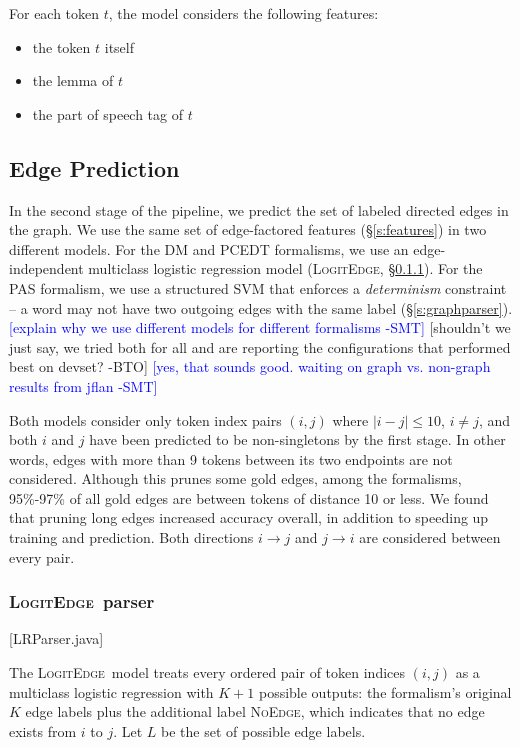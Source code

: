 \documentclass[11pt]{article}
\newcommand{\bocomment}[1]{\textcolor{Bittersweet}{[#1 -BTO]}}
\newcommand{\sam}[1]{\textcolor{blue}{[#1 -SMT]}}
\newcommand{\codenote}[1]{\textcolor{PineGreen}{[#1]}}
\newcommand{\logitedge}{\textsc{LogitEdge}}
\newcommand{\noedge}{\textsc{NoEdge}}
\begin{document}
For each token $t$, the model considers the following features:
\begin{itemize}
\item the token $t$ itself
\item the lemma of $t$
\item the part of speech tag of $t$
\end{itemize}



\subsection{Edge Prediction} \label{s:edge_model}

In the second stage of the pipeline, we predict the set of labeled directed
edges in the graph.
We use the same set of edge-factored features (\S\ref{s:features}) in two
different models.
For the DM and PCEDT formalisms, we use an edge-independent multiclass logistic
regression model (\logitedge, \S\ref{s:logitedge}).
For the PAS formalism, we use a structured SVM 
\cite{taskar_max_2003,tsochantaridis_support_2004} that enforces a
\emph{determinism} constraint -- a word may not have two outgoing edges with the
same label (\S\ref{s:graphparser}).
\sam{explain why we use different models for different formalisms}
\bocomment{shouldn't we just say, we tried both for all and are reporting the configurations that performed best on devset?}
\sam{yes, that sounds good. waiting on graph vs. non-graph results from jflan}

Both models consider only token index pairs $(i, j)$ where %
$|i-j| \leq 10$, $i \ne j$, and both $i$ and
$j$ have been predicted to be non-singletons by the first stage.
In other words, edges with more than 9 tokens between its two endpoints are not
considered.
Although this prunes some gold edges, among the formalisms,
95\%-97\% of all gold edges are between tokens of distance 10 or less.
We found that pruning long edges increased accuracy overall, in addition to
speeding up training and prediction.
Both directions $i \rightarrow j$ and $j \rightarrow
i$ are considered between every pair.


\subsubsection{\logitedge\ parser} 
\label{s:logitedge}


\codenote{LRParser.java}

The \logitedge\ model treats every ordered pair of token indices $(i, j)$ as a
multiclass logistic regression with $K+1$ possible outputs:
the formalism's original $K$ edge labels plus the additional label \noedge,
which indicates that no edge exists from $i$ to $j$.
Let $L$ be the set of possible edge labels.
\end{document}
